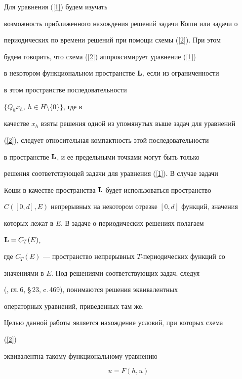 Для уравнения (\ref{1}) будем изучать


возможность приближенного нахождения решений задачи Коши или задачи о 


периодических по времени решений при помощи схемы (\ref{2}). При этом


будем говорить, что схема (\ref{2}) аппроксимирует уравнение (\ref{1}) 


в некотором функциональном пространстве ${\bold L}$, если из ограниченности


в этом пространстве последовательности 


$\{ Q_hx_h, \ h\in H\setminus \{ 0 \} \}$, где в 


качестве $x_h$ взяты решения одной из упомянутых выше задач для уравнений


(\ref{2}), следует относительная компактность этой последовательности 


в пространстве ${\bold L}$, и ее предельными точками могут быть только


решения соответствующей задачи для уравнения (\ref{1}). В случае задачи


Коши в качестве пространства ${\bold L}$ будет использоваться пространство


$C([0,d],E)$ непрерывных на некотором отрезке $[0,d]$ функций, значения


которых лежат в $E$. В задаче о периодических решениях полагаем


${\bold L}=C_T(E)$,


где $C_T(E)$ --- пространство непрерывных $T$-периодических функций со 


значениями в $E$. Под решениями соответствующих задач, следуя 


(\cite{1}, гл.\,6, \S\,23, c.\,469), понимаются решения эквивалентных


операторных уравнений, приведенных там же. 





Целью данной работы является нахождение условий, при которых схема 


(\ref{2}) 


эквивалентна такому функциональному уравнению 


\begin{equation}


\label{4}


u=F(h,u) 


\end{equation}


